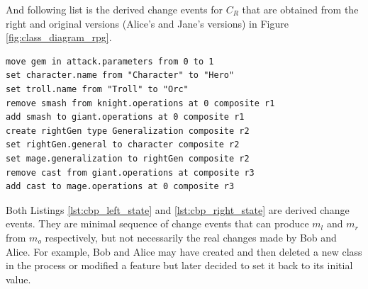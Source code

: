 And following list is the derived change events for $C_{R}$ that are obtained from the right and original versions (Alice's and Jane's versions) in Figure \ref{fig:class_diagram_rpg}. 
\begin{lstlisting}[firstnumber=1,style=eol,caption={The derived, minimal change events to produce the right version (Alice's version) in Figure \ref{fig:class_diagram_right} from the original version (Jane's version).},label=lst:cbp_right_state]
move gem in attack.parameters from 0 to 1
set character.name from "Character" to "Hero"
set troll.name from "Troll" to "Orc"
remove smash from knight.operations at 0 composite r1
add smash to giant.operations at 0 composite r1
create rightGen type Generalization composite r2
set rightGen.general to character composite r2
set mage.generalization to rightGen composite r2
remove cast from giant.operations at composite r3
add cast to mage.operations at 0 composite r3
\end{lstlisting}

Both Listings \ref{lst:cbp_left_state} and \ref{lst:cbp_right_state} are derived change events. They are minimal sequence of change events that can produce $m_{l}$ and $m_{r}$ from $m_{o}$ respectively, but not necessarily the real changes made by Bob and Alice. For example, Bob and Alice may have created and then deleted a new class in the process or modified a feature but later decided to set it back to its initial value.

